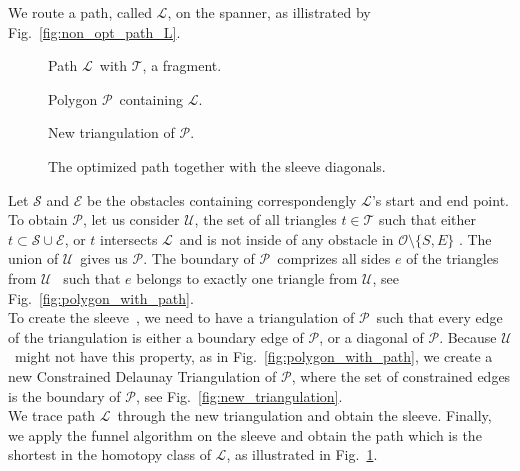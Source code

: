 \documentclass{gd-llncs}
\newcommand{\cdt}{$\mathcal{T}$}
\newcommand{\unpath}{$\mathcal{L}$}
\newcommand{\triset}{$\mathcal{U}$}
\newcommand{\plg}{$\mathcal{P}$}
\begin{document}
{We route a path, called \unpath, on the spanner, as illistrated by Fig.~\ref{fig:non_opt_path_L}.
\begin{figure}[!tbp]
  \centering
  \begin{minipage}[b]{0.45\textwidth}
    
    \caption{Path \unpath~with \cdt, a fragment.}
    \label{fig:non_opt_path_L}
  \end{minipage}
  \hfill
  \begin{minipage}[b]{0.45\textwidth}
    
    \caption{Polygon \plg~containing \unpath.}
    \label{fig:polygon_with_path}
  \end{minipage}
  \vfill
  \begin{minipage}[b]{0.45\textwidth}
    
    \caption{New triangulation of \plg.}
    \label{fig:new_triangulation}
  \end{minipage}
  \hfill
  \begin{minipage}[b]{0.45\textwidth}
    
    \caption{The optimized path together with the sleeve diagonals.}
    \label{fig:optimized_path}
  \end{minipage}
\end{figure}
Let $\mathcal{S}$ and $\mathcal{E}$ be the obstacles containing correspondengly \unpath's start and end point.
To obtain \plg, let us consider \triset, the set of all triangles ${t} \in \mathcal{T}$ such that
either ${t} \subset \mathcal{S} \cup \mathcal{E}$, or $t$ intersects \unpath~and is not inside of any obstacle in $\mathcal{O} \setminus \{S,E\}$  .
The union of \triset~gives us \plg. The boundary of \plg~comprizes all sides $e$ of the triangles from \triset~ such that $e$ belongs to exactly one triangle from \triset, see Fig.~\ref{fig:polygon_with_path}. \\
To create the sleeve~\cite{chazelle1982theorem,hershberger1994computing}, we need to have a triangulation of \plg~such that every edge of the triangulation is either a boundary edge of \plg, or a diagonal of \plg. Because \triset~might not have this property, as in Fig.~\ref{fig:polygon_with_path}, we create a new Constrained Delaunay Triangulation of \plg, where the set of constrained edges is the boundary of \plg, see Fig.~\ref{fig:new_triangulation}.\\
We trace path \unpath~through the new triangulation and obtain the sleeve. Finally, we apply the funnel algorithm on the sleeve and obtain the path which is the shortest in the homotopy class of \unpath, as illustrated in Fig.~\ref{fig:optimized_path}.\\
}
\end{document}
